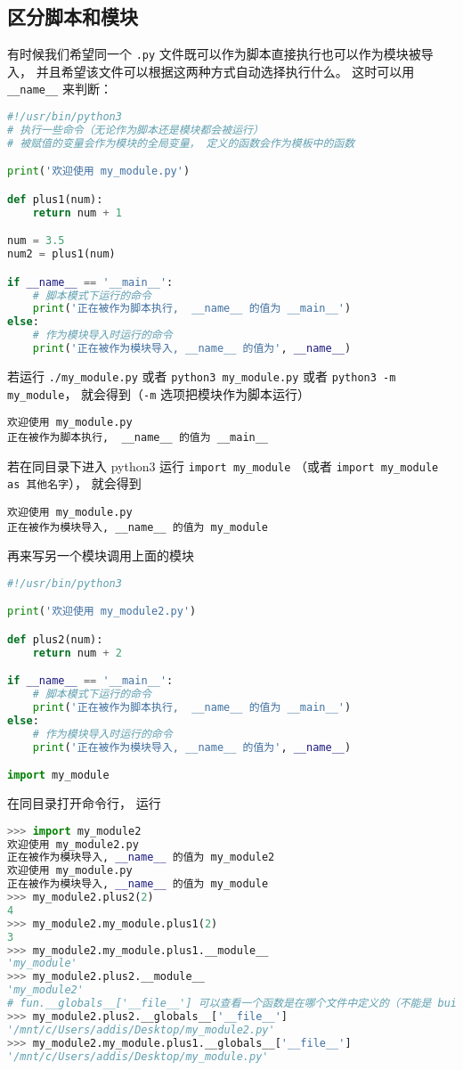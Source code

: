 \subsection{区分脚本和模块}
有时候我们希望同一个 \verb`.py` 文件既可以作为脚本直接执行也可以作为模块被导入， 并且希望该文件可以根据这两种方式自动选择执行什么。 这时可以用 \verb`__name__` 来判断：
\begin{lstlisting}[language=python, caption=my\_module.py]
#!/usr/bin/python3
# 执行一些命令（无论作为脚本还是模块都会被运行）
# 被赋值的变量会作为模块的全局变量， 定义的函数会作为模板中的函数

print('欢迎使用 my_module.py')

def plus1(num):
    return num + 1

num = 3.5
num2 = plus1(num)

if __name__ == '__main__':
    # 脚本模式下运行的命令
    print('正在被作为脚本执行,  __name__ 的值为 __main__')
else:
    # 作为模块导入时运行的命令
    print('正在被作为模块导入, __name__ 的值为', __name__)
\end{lstlisting}
若运行 \verb`./my_module.py` 或者 \verb`python3 my_module.py` 或者 \verb`python3 -m my_module`， 就会得到（\verb`-m` 选项把模块作为脚本运行）
\begin{lstlisting}[language=none]
欢迎使用 my_module.py
正在被作为脚本执行,  __name__ 的值为 __main__
\end{lstlisting}
若在同目录下进入 python3 运行 \verb`import my_module` （或者 \verb`import my_module as 其他名字`）， 就会得到
\begin{lstlisting}[language=none]
欢迎使用 my_module.py
正在被作为模块导入, __name__ 的值为 my_module
\end{lstlisting}

再来写另一个模块调用上面的模块
\begin{lstlisting}[language=python,caption=my\_module2.py]
#!/usr/bin/python3

print('欢迎使用 my_module2.py')

def plus2(num):
    return num + 2

if __name__ == '__main__':
    # 脚本模式下运行的命令
    print('正在被作为脚本执行,  __name__ 的值为 __main__')
else:
    # 作为模块导入时运行的命令
    print('正在被作为模块导入, __name__ 的值为', __name__)

import my_module
\end{lstlisting}

在同目录打开命令行， 运行
\begin{lstlisting}[language=python]
>>> import my_module2
欢迎使用 my_module2.py
正在被作为模块导入, __name__ 的值为 my_module2
欢迎使用 my_module.py
正在被作为模块导入, __name__ 的值为 my_module
>>> my_module2.plus2(2)
4
>>> my_module2.my_module.plus1(2)
3
>>> my_module2.my_module.plus1.__module__
'my_module'
>>> my_module2.plus2.__module__
'my_module2'
# fun.__globals__['__file__'] 可以查看一个函数是在哪个文件中定义的（不能是 builtin 函数）。
>>> my_module2.plus2.__globals__['__file__']
'/mnt/c/Users/addis/Desktop/my_module2.py'
>>> my_module2.my_module.plus1.__globals__['__file__']
'/mnt/c/Users/addis/Desktop/my_module.py'
\end{lstlisting}

